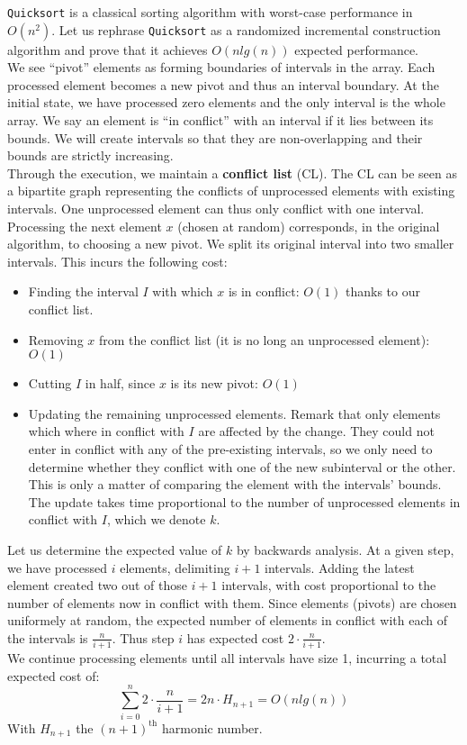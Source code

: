 
\texttt{Quicksort} is a classical sorting algorithm with worst-case performance in $O(n^2)$. Let us rephrase \texttt{Quicksort} as a randomized incremental construction algorithm and prove that it achieves $O(n lg(n))$ expected performance.\\

We see ``pivot'' elements as forming boundaries of intervals in the array. Each processed element becomes a new pivot and thus an interval boundary. At the initial state, we have processed zero elements and the only interval is the whole array. We say an element is ``in conflict'' with an interval if it lies between its bounds. We will create intervals so that they are non-overlapping and their bounds are strictly increasing.\\

Through the execution, we maintain a \textbf{conflict list} (CL). The CL can be seen as a bipartite graph representing the conflicts of unprocessed elements with existing intervals. One unprocessed element can thus only conflict with one interval.\\

Processing the next element $x$ (chosen at random) corresponds, in the original algorithm, to choosing a new pivot. We split its original interval into two smaller intervals. This incurs the following cost:
\begin{itemize}
  \item Finding the interval $I$ with which $x$ is in conflict: $O(1)$ thanks to our conflict list.
  \item Removing $x$ from the conflict list (it is no long an unprocessed element): $O(1)$
  \item Cutting $I$ in half, since $x$ is its new pivot: $O(1)$
  \item Updating the remaining unprocessed elements. Remark that only elements which where in conflict with $I$ are affected by the change. They could not enter in conflict with any of the pre-existing intervals, so we only need to determine whether they conflict with one of the new subinterval or the other. This is only a matter of comparing the element with the intervals' bounds. The update takes time proportional to the number of unprocessed elements in conflict with $I$, which we denote $k$.
\end{itemize}

Let us determine the expected value of $k$ by backwards analysis. At a given step, we have processed $i$ elements, delimiting $i+1$ intervals. Adding the latest element created two out of those $i+1$ intervals, with cost proportional to the number of elements now in conflict with them. Since elements (pivots) are chosen uniformely at random, the expected number of elements in conflict with each of the intervals is $\frac{n}{i+1}$. Thus step $i$ has expected cost $2 \cdot \frac{n}{i+1}$.\\

We continue processing elements until all intervals have size 1, incurring a total expected cost of:
\[
  \sum_{i=0}^n {2 \cdot \frac{n}{i+1}} = 2n \cdot H_{n+1} = O(n lg(n))
\]
With $H_{n+1}$ the $(n+1)^\text{th}$ harmonic number.
